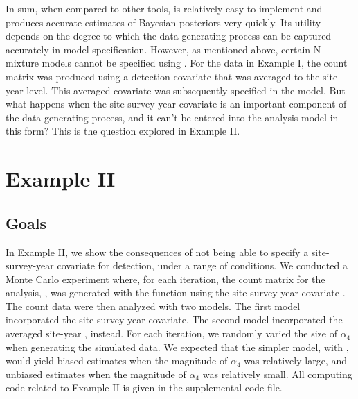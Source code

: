 \documentclass[codesnippet]{jss}
\begin{document}
In sum, when compared to other tools,  is relatively easy to 
implement and produces accurate estimates of Bayesian posteriors very 
quickly. Its utility depends on the degree to which the data generating 
process can be captured accurately in model specification. However, as 
mentioned above, certain N-mixture models cannot be specified using 
. For the data in Example I, the count matrix was produced using 
a detection covariate that was averaged to the site-year level. This 
averaged covariate was subsequently specified in the model. But what happens 
when the site-survey-year covariate is an important component of the data 
generating process, and it can't be entered into the analysis model in this 
form? This is the question explored in Example II.

\section[Example II]{Example II}
\subsection[Goals]{Goals}
In Example II, we show the consequences of not being able to specify a site-survey-year covariate for detection, under a range of conditions. We conducted a Monte Carlo experiment where, for each iteration, the count matrix for the analysis, , was generated with the  function using the site-survey-year covariate . The count data were then analyzed with two  models. The first model incorporated the site-survey-year  covariate. The second model incorporated the averaged site-year , instead. For each iteration, we randomly varied the size of $\alpha_4$ when generating the simulated data. We expected that the simpler model, with , would yield biased estimates when the magnitude of $\alpha_4$ was relatively large, and unbiased estimates when the magnitude of $\alpha_4$ was relatively small. All computing code related to Example II is given in the supplemental code file.
\end{document}
